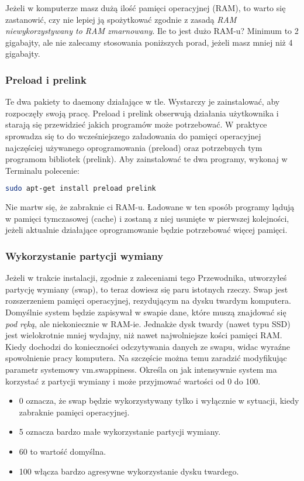Jeżeli w komputerze masz dużą ilość pamięci operacyjnej (RAM), to warto się zastanowić, czy nie lepiej ją spożytkować zgodnie z zasadą \emph{RAM niewykorzystywany to RAM zmarnowany}. Ile to jest dużo RAM-u? Minimum to 2 gigabajty, ale nie zalecamy stosowania poniższych porad, jeżeli masz mniej niż 4 gigabajty.

\subsubsection{Preload i prelink}
Te dwa pakiety to daemony działające w tle. Wystarczy je zainstalować, aby rozpoczęły swoją pracę. \textcolor{ubuntu_orange}{Preload i prelink} obserwują działania użytkownika i starają się przewidzieć jakich programów może potrzebować. W praktyce sprowadza się to do wcześniejszego załadowania do pamięci operacyjnej najczęściej używanego oprogramowania (preload) oraz potrzebnych tym programom bibliotek (prelink). Aby zainstalować te dwa programy, wykonaj w Terminalu polecenie:

\begin{lstlisting}[language=bash]
sudo apt-get install preload prelink
\end{lstlisting}

Nie martw się, że zabraknie ci RAM-u. Ładowane w ten sposób programy lądują w pamięci tymczasowej (cache) i zostaną z niej usunięte w pierwszej kolejności, jeżeli aktualnie działające oprogramowanie będzie potrzebować więcej pamięci.

\subsubsection{Wykorzystanie partycji wymiany}
Jeżeli w trakcie instalacji, zgodnie z zaleceniami tego Przewodnika, utworzyłeś partycję wymiany (swap), to teraz dowiesz się paru istotnych rzeczy. Swap jest rozszerzeniem pamięci operacyjnej, rezydującym na dysku twardym komputera. Domyślnie system będzie zapisywał w swapie dane, które muszą znajdować się \emph{pod ręką}, ale niekoniecznie w RAM-ie. Jednakże dysk twardy (nawet typu SSD) jest wielokrotnie mniej wydajny, niż nawet najwolniejsze kości pamięci RAM. Kiedy dochodzi do konieczności odczytywania danych ze swapu, widac wyraźne spowolnienie pracy komputera. Na szczęście można temu zaradzić modyfikując parametr systemowy \textcolor{ubuntu_orange}{vm.swappiness}. Określa on jak intensywnie system ma korzystać z partycji wymiany i może przyjmować wartości od 0 do 100.

\begin{itemize}
\item \textcolor{ubuntu_orange}{0} oznacza, że swap będzie wykorzystywany tylko i wyłącznie w sytuacji, kiedy zabraknie pamięci operacyjnej.
\item \textcolor{ubuntu_orange}{5} oznacza bardzo małe wykorzystanie partycji wymiany.
\item \textcolor{ubuntu_orange}{60} to wartość domyślna.
\item \textcolor{ubuntu_orange}{100} włącza bardzo agresywne wykorzystanie dysku twardego.
\end{itemize}

